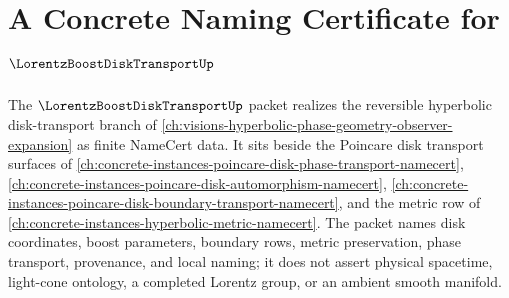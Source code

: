 \chapter{A Concrete Naming Certificate for $\LorentzBoostDiskTransportUp$}
\label{ch:concrete-instances-lorentz-boost-disk-transport-namecert}

The $\LorentzBoostDiskTransportUp$ packet realizes the reversible hyperbolic disk-transport branch of \autoref{ch:visions-hyperbolic-phase-geometry-observer-expansion} as finite NameCert data. It sits beside the Poincare disk transport surfaces of \autoref{ch:concrete-instances-poincare-disk-phase-transport-namecert}, \autoref{ch:concrete-instances-poincare-disk-automorphism-namecert}, \autoref{ch:concrete-instances-poincare-disk-boundary-transport-namecert}, and the metric row of \autoref{ch:concrete-instances-hyperbolic-metric-namecert}. The packet names disk coordinates, boost parameters, boundary rows, metric preservation, phase transport, provenance, and local naming; it does not assert physical spacetime, light-cone ontology, a completed Lorentz group, or an ambient smooth manifold.

